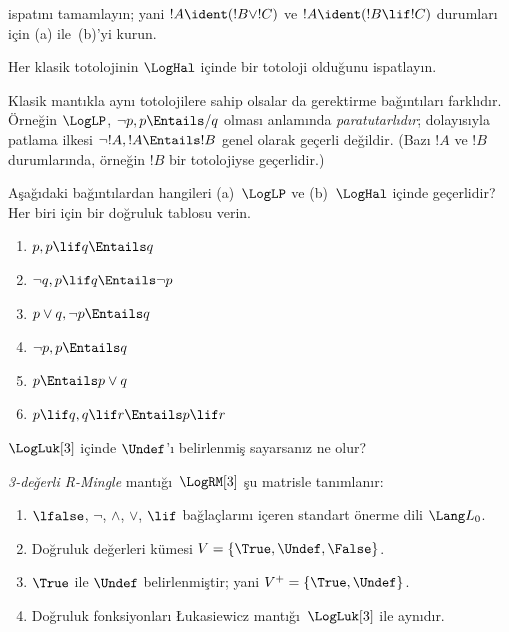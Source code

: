 \documentclass[../../../include/open-logic-section]{subfiles}
\begin{document}
\begin{prob}
   ispatını tamamlayın; yani
  $!A \ident (!B \lor !C)$ ve $!A \ident (!B \lif !C)$ durumları için
  (a) ile~(b)'yi kurun.
\end{prob}

\begin{prob}
Her klasik totolojinin $\LogHal$ içinde bir totoloji olduğunu ispatlayın.
\end{prob}

Klasik mantıkla aynı totolojilere sahip olsalar da gerektirme bağıntıları
farklıdır. Örneğin $\LogLP$, $\lnot p, p \Entails/ q$ olması anlamında
\emph{paratutarlıdır}; dolayısıyla patlama ilkesi
$\lnot !A, !A \Entails !B$ genel olarak geçerli değildir. (Bazı $!A$ ve
$!B$ durumlarında, örneğin $!B$ bir totolojiyse geçerlidir.)

\begin{prob}
  Aşağıdaki bağıntılardan hangileri (a)~$\LogLP$ ve
  (b)~$\LogHal$ içinde geçerlidir? Her biri için bir doğruluk tablosu verin.
  \begin{enumerate}
    \item $p, p \lif q \Entails q$
    \item $\lnot q, p \lif q \Entails \lnot p$
    \item $p \lor q, \lnot p \Entails q$
    \item $\lnot p, p \Entails q$
    \item $p \Entails p \lor q$
    \item $p \lif q, q\lif r \Entails p \lif r$
  \end{enumerate}
\end{prob}

$\LogLuk[3]$ içinde $\Undef$'ı belirlenmiş sayarsanız ne olur?

\begin{defn}
  \emph{3-değerli R-Mingle} mantığı~$\LogRM[3]$ şu matrisle tanımlanır:
  \begin{enumerate}
    \item $\lfalse$, $\lnot$, $\land$, $\lor$, $\lif$ bağlaçlarını içeren
    standart önerme dili $\Lang L_0$.
    \item Doğruluk değerleri kümesi $V = \{\True, \Undef, \False\}$.
    \item $\True$ ile $\Undef$ belirlenmiştir; yani
    $V^+ = \{\True, \Undef\}$.
    \item Doğruluk fonksiyonları \L ukasiewicz mantığı~$\LogLuk[3]$ ile
    aynıdır.
  \end{enumerate}
\end{defn}
\end{document}
